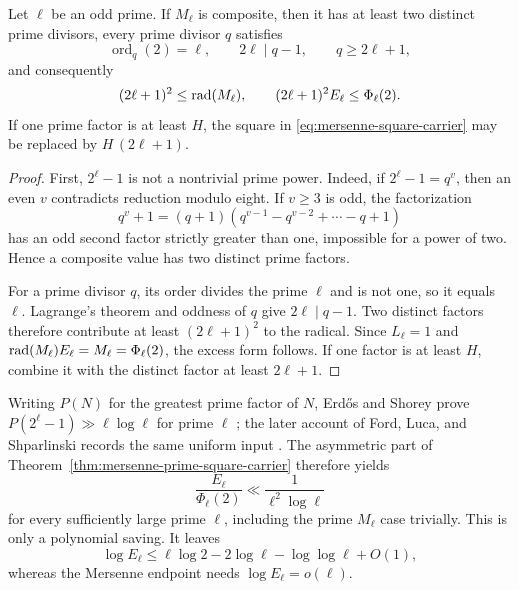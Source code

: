 \begin{theorem}
\label{thm:mersenne-prime-square-carrier}
Let $\ell$ be an odd prime.  If $M_\ell$ is composite, then it has at least
two distinct prime divisors, every prime divisor $q$ satisfies
\[
 \operatorname{ord}_q(2)=\ell,\qquad
 2\ell\mid q-1,\qquad q\ge2\ell+1,
\]
and consequently
\begin{equation}\label{eq:mersenne-square-carrier}
 (2\ell+1)^2\le\operatorname{rad}(M_\ell),\qquad
 (2\ell+1)^2E_\ell\le\Phi_\ell(2).
\end{equation}
If one prime factor is at least $H$, the square in
\eqref{eq:mersenne-square-carrier} may be replaced by
$H\,(2\ell+1)$.
\end{theorem}

\begin{proof}
First, $2^\ell-1$ is not a nontrivial prime power.  Indeed, if
$2^\ell-1=q^v$, then an even $v$ contradicts reduction modulo eight.  If
$v\ge3$ is odd, the factorization
\[
 q^v+1=(q+1)(q^{v-1}-q^{v-2}+\cdots-q+1)
\]
has an odd second factor strictly greater than one, impossible for a power of
two.  Hence a composite value has two distinct prime factors.

For a prime divisor $q$, its order divides the prime $\ell$ and is not one,
so it equals $\ell$.  Lagrange's theorem and oddness of $q$ give
$2\ell\mid q-1$.  Two distinct factors therefore contribute at least
$(2\ell+1)^2$ to the radical.  Since $L_\ell=1$ and
$\operatorname{rad}(M_\ell)E_\ell=M_\ell=\Phi_\ell(2)$, the excess form follows.  If one
factor is at least $H$, combine it with the distinct factor at least
$2\ell+1$.
\end{proof}

Writing $P(N)$ for the greatest prime factor of $N$, Erd\H{o}s and Shorey prove
$P(2^\ell-1)\gg\ell\log\ell$ for prime $\ell$
\cite{ErdosShorey1976}; the later account of Ford, Luca, and Shparlinski
records the same uniform input \cite{FordLucaShparlinski2009}.  The asymmetric
part of Theorem~\ref{thm:mersenne-prime-square-carrier} therefore yields
\begin{equation}\label{eq:mersenne-literature-saving}
 \frac{E_\ell}{\Phi_\ell(2)}
       \ll\frac1{\ell^2\log\ell}
\end{equation}
for every sufficiently large prime $\ell$, including the prime
$M_\ell$ case trivially.  This is only a polynomial saving.  It leaves
\[
 \log E_\ell\le \ell\log2-2\log\ell-\log\log\ell+O(1),
\]
whereas the Mersenne endpoint needs $\log E_\ell=o(\ell)$.

